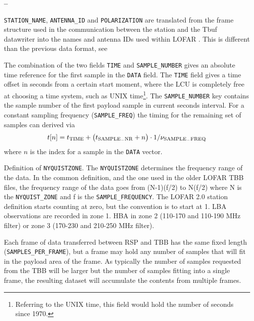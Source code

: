 \documentclass[a4paper,10pt,bibtotoc]{scrartcl}
\begin{document}
\begin{list}{\textbf{--}}{}
\item \verb|STATION_NAME|, \verb|ANTENNA_ID| and \verb|POLARIZATION| are translated from the frame structure used in the communication between the station and the Tbuf datawriter into the names and antenna IDs used within LOFAR \cite{poiesz.2006}. This is different than the previous data format, see \cite{lofar.icd.001}

\item The combination of the two fields \verb|TIME| and
  \verb|SAMPLE_NUMBER| gives an absolute time reference for the first
  sample in the \verb|DATA| field. The \verb|TIME| field gives a time
  offset in seconds from a certain start moment, where the LCU is
  completely free at choosing a time system, such as UNIX
  time\footnote{Referring to the UNIX time, this field would hold the
    number of seconds since 1970.}.  The \verb|SAMPLE_NUMBER| key
  contains the sample number of the first payload sample in current
  seconds interval.  For a constant sampling frequency
  (\verb|SAMPLE_FREQ|) the timing for the remaining set of samples can
  derived via \cite{poiesz.2006}
  \begin{equation}
    t[n] = t_{\rm TIME} + \left( t_{\rm SAMPLE_-NR} + n  \right) \cdot
    1/\nu_{\rm SAMPLE_-FREQ}
  \end{equation}
  where $n$ is the index for a sample in the \verb|DATA| vector.
\item Definition of \verb|NYQUISTZONE|.
  The \verb|NYQUISTZONE| determines the frequency range of the data. In the common definition, and the one used in the older LOFAR TBB files, the frequency range of the data goes from (N-1)(f/2) to N(f/2) where N is the \texttt{NYQUIST\_ZONE} and f is the \texttt{SAMPLE\_FREQUENCY}. The LOFAR 2.0 station definition starts counting at zero, but the convention is to start at 1. LBA observations are recorded in zone 1. HBA in zone 2 (110-170 and 110-190 MHz filter) or zone 3 (170-230 and 210-250 MHz filter).
\item Each frame of data transferred between RSP and TBB has the same fixed
  length (\verb|SAMPLES_PER_FRAME|), but a frame may hold any number of samples
  that will fit in the payload area of the frame. As typically the
  number of samples requested from the TBB will be larger but the
  number of samples fitting into a single frame, the resulting dataset
  will accumulate the contents from multiple frames.

\end{list}
\end{document}
